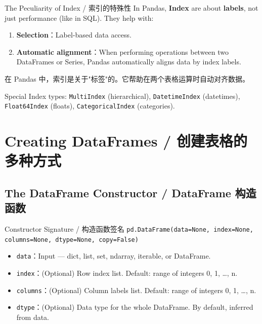 \documentclass[11pt,a4paper]{article}
\begin{document}
\begin{concept}{The Peculiarity of Index / 索引的特殊性}
    In Pandas, \textbf{Index} are about \textbf{labels}, not just performance (like in SQL). They help with:
    \begin{enumerate}[itemsep=0.3em]
        \item \textbf{Selection}：Label-based data access.
        \item \textbf{Automatic alignment}：When performing operations between two DataFrames or Series, Pandas automatically aligns data by index labels.
    \end{enumerate}
    在 Pandas 中，索引是关于"标签"的。它帮助在两个表格运算时自动对齐数据。

    Special Index types: \texttt{MultiIndex} (hierarchical), \texttt{DatetimeIndex} (datetimes), \texttt{Float64Index} (floats), \texttt{CategoricalIndex} (categories).
\end{concept}

\section{Creating DataFrames / 创建表格的多种方式}

\subsection{The DataFrame Constructor / DataFrame 构造函数}

\begin{concept}{Constructor Signature / 构造函数签名}
    \texttt{pd.DataFrame(data=None, index=None, columns=None, dtype=None, copy=False)}
    \begin{itemize}[itemsep=0.3em]
        \item \texttt{data}：Input — dict, list, set, ndarray, iterable, or DataFrame.
        \item \texttt{index}：(Optional) Row index list. Default: range of integers 0, 1, …, n.
        \item \texttt{columns}：(Optional) Column labels list. Default: range of integers 0, 1, …, n.
        \item \texttt{dtype}：(Optional) Data type for the whole DataFrame. By default, inferred from data.
    \end{itemize}
\end{concept}
\end{document}
